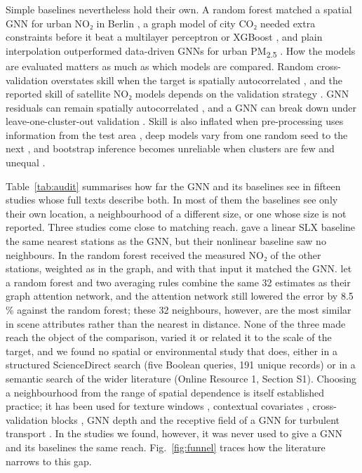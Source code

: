 \documentclass[pdflatex,sn-basic]{sn-jnl}
\begin{document}
Simple baselines nevertheless hold their own. A random forest matched a spatial GNN for urban NO₂ in Berlin \citep{schmidt2026}, a graph model of city CO₂ needed extra constraints before it beat a multilayer perceptron or XGBoost \citep{shao2026}, and plain interpolation outperformed data-driven GNNs for urban PM\textsubscript{2.5} \citep{du2026}. How the models are evaluated matters as much as which models are compared. Random cross-validation overstates skill when the target is spatially autocorrelated \citep{roberts2017,ploton2020,meyer2022,wadoux2021,mila2022,linnenbrink2026}, and the reported skill of satellite NO₂ models depends on the validation strategy \citep{zhang2026}. GNN residuals can remain spatially autocorrelated \citep{bao2024}, and a GNN can break down under leave-one-cluster-out validation \citep{flores2026}. Skill is also inflated when pre-processing uses information from the test area \citep{kapoor2023}, deep models vary from one random seed to the next \citep{bouthillier2021}, and bootstrap inference becomes unreliable when clusters are few and unequal \citep{cameron2008,mackinnon2023}.

Table~\ref{tab:audit} summarises how far the GNN and its baselines see in fifteen studies whose full texts describe both. In most of them the baselines see only their own location, a neighbourhood of a different size, or one whose size is not reported. Three studies come close to matching reach. \citet{liang2023} gave a linear SLX baseline the same nearest stations as the GNN, but their nonlinear baseline saw no neighbours. In \citet{schmidt2026} the random forest received the measured NO₂ of the other stations, weighted as in the graph, and with that input it matched the GNN. \citet{bai2025} let a random forest and two averaging rules combine the same 32 estimates as their graph attention network, and the attention network still lowered the error by 8.5\,\% against the random forest; these 32 neighbours, however, are the most similar in scene attributes rather than the nearest in distance. None of the three made reach the object of the comparison, varied it or related it to the scale of the target, and we found no spatial or environmental study that does, either in a structured ScienceDirect search (five Boolean queries, 191 unique records) or in a semantic search of the wider literature (Online Resource 1, Section S1). Choosing a neighbourhood from the range of spatial dependence is itself established practice; it has been used for texture windows \citep{franklin1996}, contextual covariates \citep{behrens2019}, cross-validation blocks \citep{valavi2019}, GNN depth \citep{alon2021} and the receptive field of a GNN for turbulent transport \citep{freitas2026}. In the studies we found, however, it was never used to give a GNN and its baselines the same reach. Fig.~\ref{fig:funnel} traces how the literature narrows to this gap.
\end{document}
